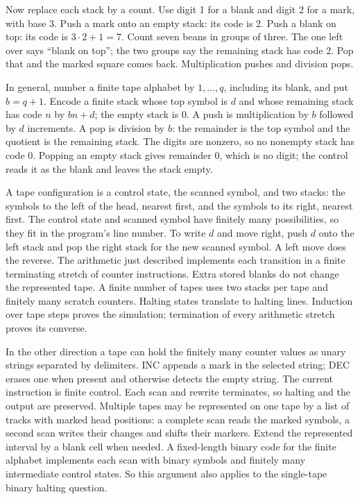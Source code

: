 \documentclass[11pt,twoside]{article}
\theoremstyle{thielethm}
\theoremstyle{thieledef}
\theoremstyle{thieledef}
\theoremstyle{thieledef}
\theoremstyle{thielethm}
\theoremstyle{thieleobs}
\theoremstyle{thielethm}
\begin{document}
Now replace each stack by a count. Use digit 1 for a blank and digit 2 for a mark,
with base 3. Push a mark onto an empty stack: its code is 2. Push a blank on top:
its code is $3\cdot2+1=7$. Count seven beans in groups of three. The one left over
says ``blank on top''; the two groups say the remaining stack has code 2. Pop that
and the marked square comes back. Multiplication pushes and division pops.

In general, number a finite tape alphabet by $1,\ldots,q$, including its blank,
and put $b=q+1$.
Encode a finite stack whose top symbol is $d$ and whose remaining stack has code $n$
by $bn+d$; the empty stack is 0. A push is multiplication by $b$ followed by $d$
increments. A pop is division by $b$: the remainder is the top symbol and the quotient
is the remaining stack. The digits are nonzero, so no nonempty stack has code 0.
Popping an empty stack gives remainder 0, which is no digit; the control reads it as the blank and leaves the stack empty.

A tape configuration is a control state, the scanned symbol, and two stacks: the
symbols to the left of the head, nearest first, and the symbols to its right,
nearest first. The control state and scanned symbol have finitely many possibilities,
so they fit in the program's line number. To write $d$ and move right, push $d$ onto
the left stack and pop the right stack for the new scanned symbol. A left move does
the reverse. The arithmetic just described implements each transition in a finite
terminating stretch of counter instructions. Extra stored blanks do not change the
represented tape. A finite number of tapes uses two stacks per tape and finitely
many scratch counters. Halting states translate to halting lines. Induction over tape
steps proves the simulation; termination of every arithmetic stretch proves its converse.

In the other direction a tape can hold the finitely many counter values as unary
strings separated by delimiters. INC appends a mark in the selected string; DEC erases
one when present and otherwise detects the empty string. The current instruction is
finite control. Each scan and rewrite terminates, so halting and the output are preserved.
Multiple tapes may be represented on one tape by a list of tracks with marked head
positions: a complete scan reads the marked symbols, a second scan writes their changes
and shifts their markers. Extend the represented interval by a blank cell when needed.
A fixed-length binary code for the finite alphabet implements each scan with binary
symbols and finitely many intermediate control states. So this argument also applies
to the single-tape binary halting question.
\end{document}
